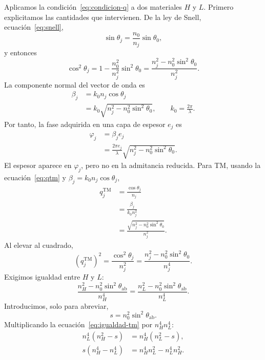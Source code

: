 \documentclass[10pt,a4paper]{article}
\begin{document}
Aplicamos la condici\'on~\eqref{eq:condicion-q} a dos materiales $H$ y $L$. Primero explicitamos las cantidades que intervienen. De la ley de Snell, ecuaci\'on~\eqref{eq:snell},
\begin{equation}
\sin\theta_j=\frac{n_0}{n_j}\sin\theta_0,
\end{equation}
y entonces
\begin{equation}
\cos^2\theta_j
=1-\frac{n_0^2}{n_j^2}\sin^2\theta_0
=\frac{n_j^2-n_0^2\sin^2\theta_0}{n_j^2}.
\label{eq:cos2}
\end{equation}
La componente normal del vector de onda es
\begin{align}
\beta_j
&=k_0n_j\cos\theta_j
\nonumber\\
&=k_0\sqrt{n_j^2-n_0^2\sin^2\theta_0},
\qquad
k_0=\frac{2\pi}{\lambda}.
\label{eq:beta-seccion-tm}
\end{align}
Por tanto, la fase adquirida en una capa de espesor $e_j$ es
\begin{align}
\varphi_j
&=\beta_j e_j
\nonumber\\
&=\frac{2\pi e_j}{\lambda}
\sqrt{n_j^2-n_0^2\sin^2\theta_0}.
\label{eq:phi-explicita-tm}
\end{align}
El espesor aparece en $\varphi_j$, pero no en la admitancia reducida. Para TM, usando la ecuaci\'on~\eqref{eq:qtm} y $\beta_j=k_0n_j\cos\theta_j$,
\begin{align}
q_j^{\mathrm{TM}}
&=\frac{\cos\theta_j}{n_j}
\nonumber\\
&=\frac{\beta_j}{k_0n_j^2}
\nonumber\\
&=\frac{\sqrt{n_j^2-n_0^2\sin^2\theta_0}}{n_j^2}.
\label{eq:qtm-beta}
\end{align}
Al elevar al cuadrado,
\begin{equation}
\left(q_j^{\mathrm{TM}}\right)^2
=\frac{\cos^2\theta_j}{n_j^2}
=\frac{n_j^2-n_0^2\sin^2\theta_0}{n_j^4}.
\label{eq:qtm2}
\end{equation}
Exigimos igualdad entre $H$ y $L$:
\begin{equation}
\frac{n_H^2-n_0^2\sin^2\theta_{\mathrm{ab}}}{n_H^4}
=
\frac{n_L^2-n_0^2\sin^2\theta_{\mathrm{ab}}}{n_L^4}.
\label{eq:igualdad-tm}
\end{equation}
Introducimos, solo para abreviar,
\begin{equation}
s=n_0^2\sin^2\theta_{\mathrm{ab}}.
\end{equation}
Multiplicando la ecuaci\'on~\eqref{eq:igualdad-tm} por $n_H^4n_L^4$:
\begin{align}
n_L^4(n_H^2-s)&=n_H^4(n_L^2-s),\\
s(n_H^4-n_L^4)&=n_H^4n_L^2-n_L^4n_H^2.
\end{align}
\end{document}
